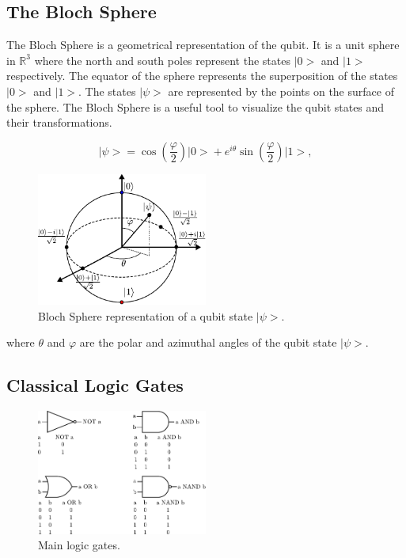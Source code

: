 \documentclass[10pt]{article}
\numberwithin{equation}{section}
\theoremstyle{defi}
\begin{document}
\subsection{The Bloch Sphere}

The Bloch Sphere is a geometrical representation of the qubit. It is a unit sphere in $\mathbb{R}^3$ where the north and south poles represent the states $\big|0\big>$ and $\big|1\big>$ respectively. The equator of the sphere represents the superposition of the states $\big|0\big>$ and $\big|1\big>$. The states $\big|\psi\big>$ are represented by the points on the surface of the sphere. The Bloch Sphere is a useful tool to visualize the qubit states and their transformations.

\begin{equation}
  \label{eq:2}
  \big|\psi\big> = \cos\left(\frac{\varphi}{2}\right)\big|0\big> + e^{i\theta}\sin\left(\frac{\varphi}{2}\right)\big|1\big>,
\end{equation}
\begin{figure}[H]
  \centering
  \includegraphics[width=0.5\textwidth]{fig-1-bloch-sphere.pdf}
  \caption{Bloch Sphere representation of a qubit state $\big|\psi\big>$.}
  \label{fig:bloch-sphere}
\end{figure}
where $\theta$ and $\varphi$ are the polar and azimuthal angles of the qubit state $\big|\psi\big>$.

\subsection{Classical Logic Gates}
\begin{figure}[H]
  \centering
  \includegraphics[width=0.5\textwidth]{logic-gates.pdf}
  \caption{Main logic gates.}
  \label{fig:logic-gates}
\end{figure}
\end{document}
